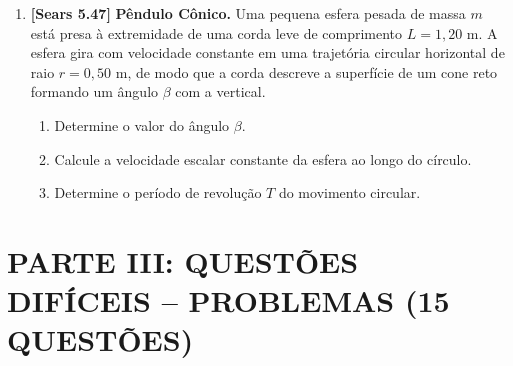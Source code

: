 \documentclass[11pt,a4paper]{article}
\begin{document}
\begin{enumerate}[label=\textbf{\arabic*.}, leftmargin=*, itemsep=0.45cm, resume]
\item \textbf{[Sears 5.47]} \textbf{Pêndulo Cônico.} Uma pequena esfera pesada de massa $m$ está presa à extremidade de uma corda leve de comprimento $L = 1,20\text{ m}$. A esfera gira com velocidade constante em uma trajetória circular horizontal de raio $r = 0,50\text{ m}$, de modo que a corda descreve a superfície de um cone reto formando um ângulo $\beta$ com a vertical.
\begin{enumerate}[label=\alph*)]
    \item Determine o valor do ângulo $\beta$.
    \item Calcule a velocidade escalar constante da esfera ao longo do círculo.
    \item Determine o período de revolução $T$ do movimento circular.
\end{enumerate}

\end{enumerate}

\newpage
\section*{PARTE III: QUESTÕES DIFÍCEIS -- PROBLEMAS (15 QUESTÕES)}
\end{document}
